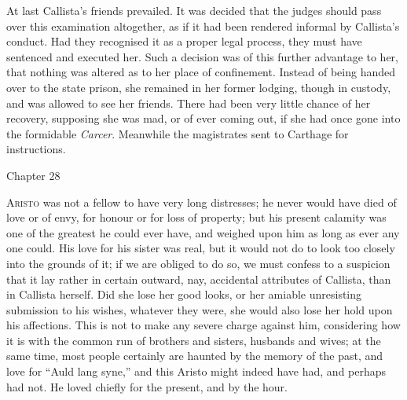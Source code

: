At last Callista's friends prevailed. It was decided that the
judges should pass over this examination altogether, as if it had been
rendered informal by Callista's conduct. Had they recognised it as a
proper legal process, they must have sentenced and executed her. Such
a decision was of this further advantage to her, that nothing was
altered as to her place of confinement. Instead of being handed over
to the state prison, she remained in her former lodging, though
in custody, and was allowed to see her friends. There had been very
little chance of her recovery, supposing she was mad, or of ever
coming out, if she had once gone into the formidable \emph{Carcer}.
Meanwhile the magistrates sent to Carthage for instructions.

Chapter 28


A\textsc{risto} was not a fellow to have very long distresses; he
never would have died of love or of envy, for honour or for loss of
property; but his present calamity was one of the greatest he could
ever have, and weighed upon him as long as ever any one could. His
love for his sister was real, but it would not do to look too closely
into the grounds of it; if we are obliged to do so, we must confess to
a suspicion that it lay rather in certain outward, nay, accidental
attributes of Callista, than in Callista herself. Did she lose her
good looks, or her amiable unresisting submission to his wishes,
whatever they were, she would also lose her hold upon his affections.
This is not to make any severe charge against him, considering how it
is with the common run of brothers and sisters, husbands and wives; at
the same time, most people certainly are haunted by the memory of the
past, and love for ``Auld lang syne,'' and this Aristo might
indeed have had, and perhaps had not. He loved chiefly for the
present, and by the hour.

